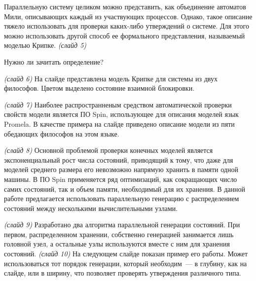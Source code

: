 \documentclass[a4paper,12pt,notitlepage]{article}
\begin{document}

Параллельную систему целиком можно представить, как объединение автоматов Мили,
описывающих каждый из участвующих процессов. Однако, такое описание тяжело использовать
для проверки каких-либо утверждений о системе. Для этого можно использовать другой способ
ее формального представления, называемый моделью Крипке. \emph{(слайд 5)}

Нужно ли зачитать определение?

\emph{(слайд 6)} На слайде представлена модель Крипке для системы из двух
философов. Цветом выделено состояние взаимной блокировки.

\emph{(слайд 7)} Наиболее распространненым средством автоматической проверки свойств
модели является ПО Spin, использующее для описания моделей язык Promela. В качестве
примера на слайде приведено описание модели из пяти обедающих философов на этом языке.

\emph{(слайд 8)} Основной проблемой проверки конечных моделей является экспоненциальный
рост числа состояний, приводящий к тому, что даже для моделей среднего размера его
невозможно напрямую хранить в памяти одной машины. В ПО Spin применяется ряд оптимизаций,
как сокращающих число самих состояний, так и объем памяти, необходимый для их хранения. В
данной работе предлагается использовать параллельную генерацию с распределением состояний
между несколькими вычислительными узлами.

\emph{(слайд 9)} Разработано два алгоритма параллельной генерации состояний. При первом,
распределенном хранении, собственно генерацией занимается лишь головной узел, а остальные
узлы используются вместе с ним для хранения состояний. \emph{(слайд 10)} На следующем
слайде показан пример его работы. Может использоваться тот порядок генерации, который
необходим~--- в глубину, как на слайде, или в ширину, что позволяет проверять утверждения
различного типа.
\end{document}
